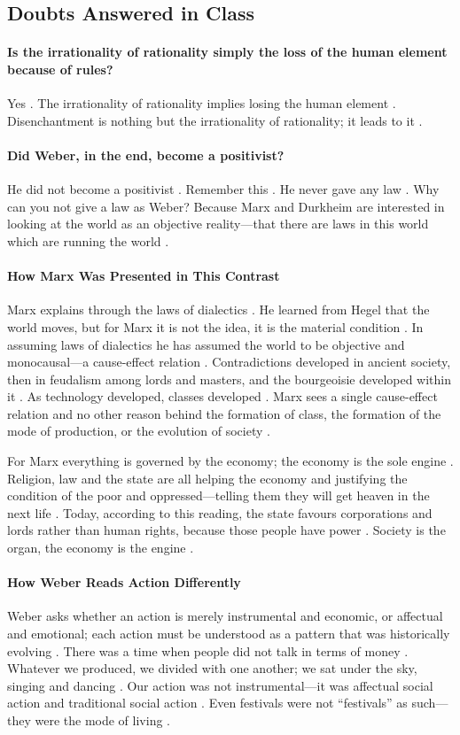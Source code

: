 \subsection{Doubts Answered in Class}
\paragraph{Is the irrationality of rationality simply the loss of the human element because of rules?}
Yes . The irrationality of rationality implies losing the human element . Disenchantment is nothing but the irrationality of rationality; it leads to it .

\paragraph{Did Weber, in the end, become a positivist?}
He did not become a positivist . Remember this . He never gave any law . Why can you not give a law as Weber? Because Marx and Durkheim are interested in looking at the world as an objective reality---that there are laws in this world which are running the world .

\paragraph{How Marx Was Presented in This Contrast}
Marx explains through the laws of dialectics . He learned from Hegel that the world moves, but for Marx it is not the idea, it is the material condition . In assuming laws of dialectics he has assumed the world to be objective and monocausal---a cause-effect relation .
Contradictions developed in ancient society, then in feudalism among lords and masters, and the bourgeoisie developed within it . As technology developed, classes developed . Marx sees a single cause-effect relation and no other reason behind the formation of class, the formation of the mode of production, or the evolution of society .

For Marx everything is governed by the economy; the economy is the sole engine . Religion, law and the state are all helping the economy and justifying the condition of the poor and oppressed---telling them they will get heaven in the next life .
Today, according to this reading, the state favours corporations and lords rather than human rights, because those people have power . Society is the organ, the economy is the engine .

\paragraph{How Weber Reads Action Differently}
Weber asks whether an action is merely instrumental and economic, or affectual and emotional; each action must be understood as a pattern that was historically evolving .
There was a time when people did not talk in terms of money . Whatever we produced, we divided with one another; we sat under the sky, singing and dancing . Our action was not instrumental---it was affectual social action and traditional social action . Even festivals were not ``festivals'' as such---they were the mode of living .

